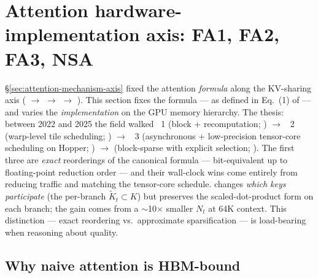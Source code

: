 
\section{Attention hardware-implementation axis: FA1, FA2, FA3, NSA}
\label{sec:attention-hardware-axis}
\label{sec:hardware-attention}

\S\ref{sec:attention-mechanism-axis} fixed the attention \emph{formula}
along the KV-sharing axis ( $\to$  $\to$  $\to$ ). This
section fixes the formula ---  as defined
in Eq.~(1) of \citet{vaswani2017} --- and varies the
\emph{implementation} on the GPU memory hierarchy. The thesis: between
2022 and 2025 the field walked ~1 (block  +
recomputation; \citealp{dao2022}) $\to$ ~2 (warp-level
tile scheduling; \citealp{dao2023}) $\to$ ~3
(asynchronous + low-precision tensor-core scheduling on Hopper;
\citealp{shah2024}) $\to$  (block-sparse with
explicit selection; \citealp{yuan2025}). The first three are
\emph{exact} reorderings of the canonical formula --- bit-equivalent up
to floating-point reduction order --- and their wall-clock wins come
entirely from reducing  traffic and matching the tensor-core
schedule.  changes \emph{which keys participate} (the per-branch
$\tilde K_t \subset K$) but preserves the scaled-dot-product form on
each branch; the gain comes from a $\sim$10$\times$ smaller $N_t$ at
64K context. This distinction --- exact reordering vs.\ approximate
sparsification --- is load-bearing when reasoning about quality.

\subsection{Why naive attention is HBM-bound}
\label{sec:fa-roofline}


